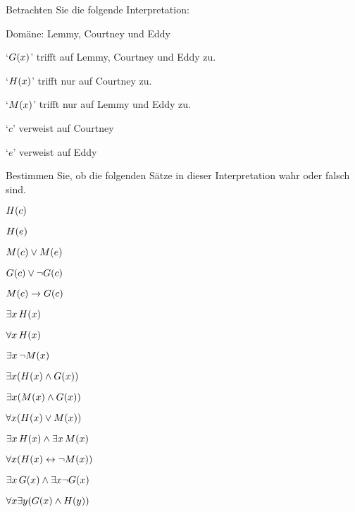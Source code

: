 \problempart
\label{pr.TorF2}
Betrachten Sie die folgende Interpretation:
	\begin{ebullet}
		\item Domäne: Lemmy, Courtney und Eddy
		\item `$\mathord{G}(x)$' trifft auf Lemmy, Courtney und Eddy zu.
		\item `$\mathord{H}(x)$' trifft nur auf Courtney zu.
		\item `$\mathord{M}(x)$' trifft nur auf Lemmy und Eddy zu.
		\item `$c$' verweist auf Courtney
		\item `$e$' verweist auf Eddy
	\end{ebullet}
Bestimmen Sie, ob die folgenden Sätze in dieser Interpretation wahr oder falsch sind.
\begin{earg}
\item $\mathord{H}(c) $
\item $\mathord{H}(e) $
\item $\mathord{M}(c)  \vee \mathord{M}(e)$
\item $\mathord{G}(c)  \vee \neg \mathord{G}(c)$
\item $\mathord{M}(c)  \rightarrow \mathord{G}(c)$
\item $\exists x\, \mathord{H}(x)$
\item $\forall x\, \mathord{H}(x)$
\item $\exists x\, \neg \mathord{M}(x)$
\item $\exists x(\mathord{H}(x) \wedge \mathord{G}(x))$
\item $\exists x(\mathord{M}(x) \wedge \mathord{G}(x))$
\item $\forall x(\mathord{H}(x) \vee \mathord{M}(x))$
\item $\exists x\, \mathord{H}(x) \wedge \exists x\, \mathord{M}(x)$
\item $\forall x(\mathord{H}(x) \leftrightarrow \neg \mathord{M}(x))$
\item $\exists x\, \mathord{G}(x) \wedge \exists x \neg \mathord{G}(x)$
\item $\forall x\exists y(\mathord{G}(x) \wedge \mathord{H}(y))$
\end{earg}

